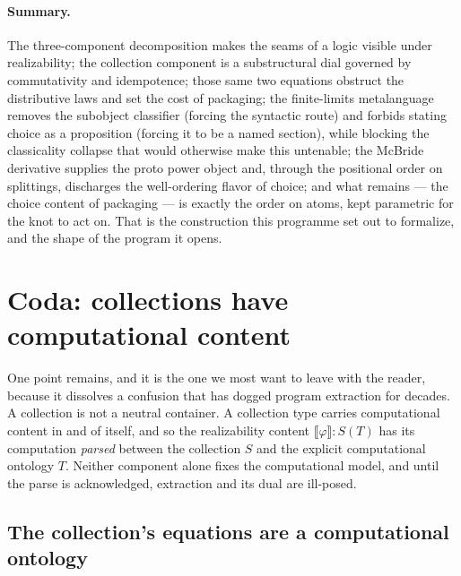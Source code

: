 \documentclass[11pt]{article}
\theoremstyle{definition}
\theoremstyle{plain}
\newcommand{\T}{T}
\newcommand{\Coll}{S}
\newcommand{\sem}[1]{\llbracket #1 \rrbracket}
\begin{document}
\paragraph{Summary.} The three-component decomposition makes the seams of a
logic visible under realizability; the collection component is a substructural
dial governed by commutativity and idempotence; those same two equations
obstruct the distributive laws and set the cost of packaging; the
finite-limits metalanguage removes the subobject classifier (forcing the
syntactic route) and forbids stating choice as a proposition (forcing it to be
a named section), while blocking the classicality collapse that would
otherwise make this untenable; the McBride derivative supplies the proto power
object and, through the positional order on splittings, discharges the
well-ordering flavor of choice; and what remains --- the choice content of
packaging --- is exactly the order on atoms, kept parametric for the knot to
act on. That is the construction this programme set out to formalize, and the shape of the
program it opens.

\section{Coda: collections have computational content}
\label{sec:coda}

One point remains, and it is the one we most want to leave with the reader,
because it dissolves a confusion that has dogged program extraction for
decades. A collection is not a neutral container. A collection type carries
computational content in and of itself, and so the realizability content
$\sem{\varphi} : \Coll(\T)$ has its computation \emph{parsed} between the
collection $\Coll$ and the explicit computational ontology $\T$. Neither
component alone fixes the computational model, and until the parse is
acknowledged, extraction and its dual are ill-posed.

\subsection{The collection's equations are a computational ontology}
\end{document}
